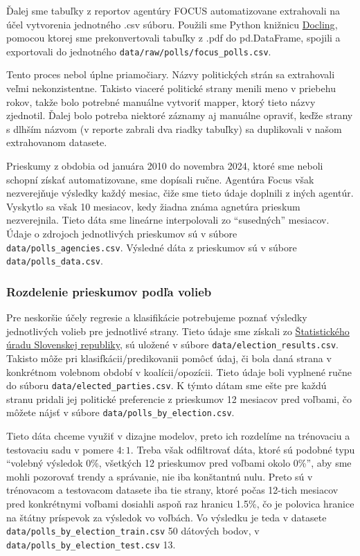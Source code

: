 \documentclass[main.tex]{subfiles}
\begin{document}
Ďalej sme tabuľky z reportov agentúry FOCUS automatizovane extrahovali na účel vytvorenia jednotného .csv súboru. Použili sme Python knižnicu \href{https://github.com/DS4SD/docling}{Docling}, pomocou ktorej sme prekonvertovali tabuľky z .pdf do pd.DataFrame, spojili a exportovali do jednotného \verb*|data/raw/polls/focus_polls.csv|.

Tento proces nebol úplne priamočiary. Názvy politických strán sa extrahovali veľmi nekonzistentne.
Takisto viaceré politické strany menili meno v priebehu rokov, takže bolo potrebné manuálne vytvoriť mapper, ktorý tieto názvy zjednotil. Ďalej bolo potreba niektoré záznamy aj manuálne opraviť, keďže strany s dlhším názvom (v reporte zabrali dva riadky tabuľky) sa duplikovali v našom extrahovanom datasete.

Prieskumy z obdobia od januára 2010 do novembra 2024, ktoré sme neboli schopní získať automatizovane, sme dopísali ručne. Agentúra Focus však nezverejňuje výsledky každý mesiac, čiže sme tieto údaje doplnili z iných agentúr. Vyskytlo sa však 10 mesiacov, kedy žiadna známa agnetúra prieskum nezverejnila. Tieto dáta sme lineárne interpolovali zo \enquote{susedných} mesiacov. Údaje o zdrojoch jednotlivých prieskumov sú v súbore \verb*|data/polls_agencies.csv|. Výsledné dáta z prieskumov sú v súbore \verb*|data/polls_data.csv|.

\subsubsection*{Rozdelenie prieskumov podľa volieb}

Pre neskoršie účely regresie a klasifikácie potrebujeme poznať výsledky jednotlivých volieb pre jednotlivé strany. Tieto údaje sme získali zo \href{https://volby.statistics.sk/}{Štatistického úradu Slovenskej republiky}, sú uložené v súbore \verb*|data/election_results.csv|. Takisto môže pri klasifkácii/predikovanii pomôcť údaj, či bola daná strana v konkrétnom volebnom období v koalícii/opozícii. Tieto údaje boli vyplnené ručne do súboru \verb*|data/elected_parties.csv|. K týmto dátam sme ešte pre každú stranu pridali jej politické preferencie z prieskumov 12 mesiacov pred voľbami, čo môžete nájsť v súbore \verb*|data/polls_by_election.csv|.

Tieto dáta chceme využiť v dizajne modelov, preto ich rozdelíme na trénovaciu a testovaciu sadu v pomere $4:1$. Treba však odfiltrovať dáta, ktoré sú podobné typu \enquote{volebný výsledok 0\%, všetkých 12 prieskumov pred voľbami okolo 0\%}, aby sme mohli pozorovať trendy a správanie, nie iba konštantnú nulu. Preto sú v trénovacom a testovacom datasete iba tie strany, ktoré počas 12-tich mesiacov pred konkrétnymi voľbami dosiahli aspoň raz hranicu 1.5\%, čo je polovica hranice na štátny príspevok za výsledok vo voľbách. Vo výsledku je teda v datasete \verb*|data/polls_by_election_train.csv| 50 dátových bodov, v \verb*|data/polls_by_election_test.csv| 13.
\end{document}
